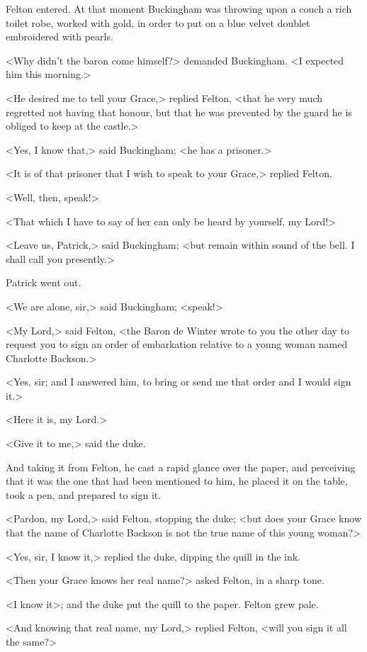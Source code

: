 Felton entered. At that moment Buckingham was throwing upon a couch a rich toilet robe, worked with gold, in order to put on a blue velvet doublet embroidered with pearls. 

<Why didn't the baron come himself?> demanded Buckingham. <I expected him this morning.> 

<He desired me to tell your Grace,> replied Felton, <that he very much regretted not having that honour, but that he was prevented by the guard he is obliged to keep at the castle.> 

<Yes, I know that,> said Buckingham; <he has a prisoner.> 

<It is of that prisoner that I wish to speak to your Grace,> replied Felton. 

<Well, then, speak!> 

<That which I have to say of her can only be heard by yourself, my Lord!> 

<Leave us, Patrick,> said Buckingham; <but remain within sound of the bell. I shall call you presently.> 

Patrick went out. 

<We are alone, sir,> said Buckingham; <speak!> 

<My Lord,> said Felton, <the Baron de Winter wrote to you the other day to request you to sign an order of embarkation relative to a young woman named Charlotte Backson.> 

<Yes, sir; and I answered him, to bring or send me that order and I would sign it.> 

<Here it is, my Lord.> 

<Give it to me,> said the duke. 

And taking it from Felton, he cast a rapid glance over the paper, and perceiving that it was the one that had been mentioned to him, he placed it on the table, took a pen, and prepared to sign it. 

<Pardon, my Lord,> said Felton, stopping the duke; <but does your Grace know that the name of Charlotte Backson is not the true name of this young woman?> 

<Yes, sir, I know it,> replied the duke, dipping the quill in the ink. 

<Then your Grace knows her real name?> asked Felton, in a sharp tone. 

<I know it>; and the duke put the quill to the paper. Felton grew pale. 

<And knowing that real name, my Lord,> replied Felton, <will you sign it all the same?> 

